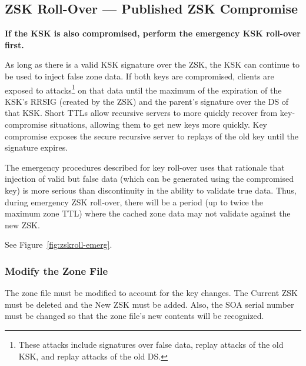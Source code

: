 
\clearpage
\subsection{ZSK Roll-Over --- Published ZSK Compromise}
\label{roll-emergency-pubzsk}

{\bf If the KSK is also compromised, perform the emergency KSK roll-over first.}

As long as there is a valid KSK signature over the ZSK, the KSK can continue
to be used to inject false zone data.  If both keys are compromised, clients
are exposed to attacks\footnote{These attacks include signatures over false
data, replay attacks of the old KSK, and replay attacks of the old DS.} on
that data until the maximum of the expiration of the KSK's RRSIG (created by
the ZSK) and the parent's signature over the DS of that KSK.  Short TTLs allow
recursive servers to more quickly recover from key-compromise situations,
allowing them to get new keys more quickly.  Key compromise exposes the secure
recursive server to replays of the old key until the signature expires.

The emergency procedures described for key roll-over uses that rationale that
injection of valid but false data (which can be generated using the
compromised key) is more serious than discontinuity in the ability to validate
true data. Thus, during emergency ZSK roll-over, there will be a period (up
to twice the maximum zone TTL) where the cached zone data may not validate
against the new ZSK.

See Figure~\ref{fig:zskroll-emerg}.





\subsubsection{Modify the Zone File}

The zone file must be modified to account for the key changes.  The Current
ZSK must be deleted and the New ZSK must be added.  Also, the SOA serial
number must be changed so that the zone file's new contents will be recognized.

